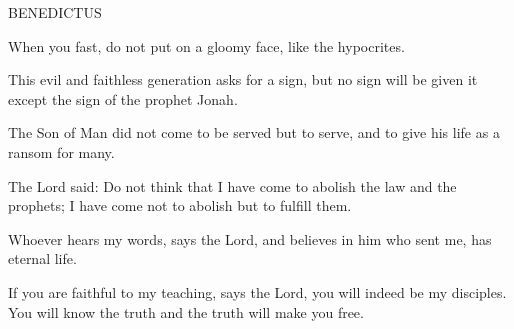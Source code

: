 \noindent\small BENEDICTUS
\begin{description}[labelindent=\parindent, leftmargin=*]
\item [Ash Wednesday:] 	When you fast, do not put on a gloomy face, like the hypocrites.
\item [Week 1:] 	This evil and faithless generation asks for a sign, but no sign will be given it except the sign of the prophet Jonah.
\item [Week 2:] 	The Son of Man did not come to be served but to serve, and to give his life as a ransom for many.
\item [Week 3:] 	The Lord said: Do not think that I have come to abolish the law and the prophets; I have come not to abolish but to fulfill them.
\item [Week 4:] 	Whoever hears my words, says the Lord, and believes in him who sent me, has eternal life.
\item [Week 5:] 	If you are faithful to my teaching, says the Lord, you will indeed be my disciples. You will know the truth and the truth will make you free.
\end{description}

